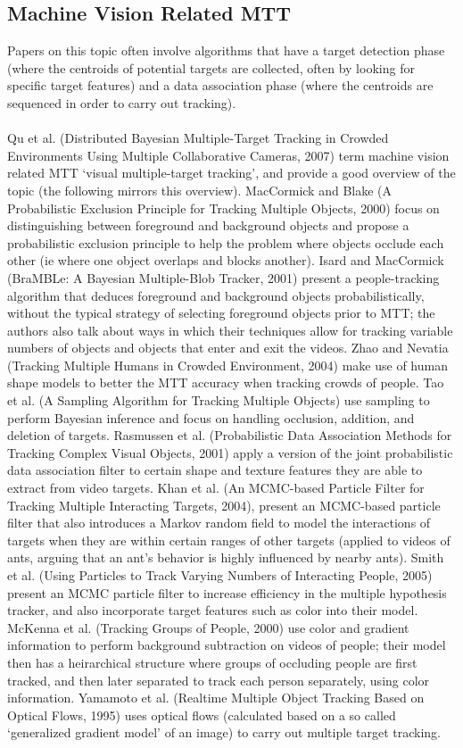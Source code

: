 \documentclass{article}
\begin{document}
\subsection*{Machine Vision Related MTT}
\vspace{6pt}
Papers on this topic often involve algorithms that have a target detection phase (where the centroids of potential targets are collected, often by looking for specific target features) and a data association phase (where the centroids are sequenced in order to carry out tracking).\\
\\
Qu et al. (Distributed Bayesian Multiple-Target Tracking in Crowded Environments Using Multiple Collaborative Cameras, 2007) term machine vision related MTT `visual multiple-target tracking', and provide a good overview of the topic (the following mirrors this overview). MacCormick and Blake (A Probabilistic Exclusion Principle for Tracking Multiple Objects, 2000) focus on distinguishing between foreground and background objects and propose a probabilistic exclusion principle to help the problem where objects occlude each other (ie where one object overlaps and blocks another). Isard and MacCormick (BraMBLe: A Bayesian Multiple-Blob Tracker, 2001) present a people-tracking algorithm that deduces foreground and background objects probabilistically, without the typical strategy of selecting foreground objects prior to MTT; the authors also talk about ways in which their techniques allow for tracking variable numbers of objects and objects that enter and exit the videos. Zhao and Nevatia (Tracking Multiple Humans in Crowded Environment, 2004) make use of human shape models to better the MTT accuracy when tracking crowds of people. Tao et al. (A Sampling Algorithm for Tracking Multiple Objects) use sampling to perform Bayesian inference and focus on handling occlusion, addition, and deletion of targets. Rasmussen et al. (Probabilistic Data Association Methods for Tracking Complex Visual Objects, 2001) apply a version of the joint probabilistic data association filter to certain shape and texture features they are  able to extract from video targets. Khan et al. (An MCMC-based Particle Filter for Tracking Multiple Interacting Targets, 2004), present an MCMC-based particle filter that also introduces a Markov random field to model the interactions of targets when they are within certain ranges of other targets (applied to videos of ants, arguing that an ant's behavior is highly influenced by nearby ants). Smith et al. (Using Particles to Track Varying Numbers of Interacting People, 2005) present an MCMC particle filter to increase efficiency in the multiple hypothesis tracker, and also incorporate target features such as color into their model. McKenna et al. (Tracking Groups of People, 2000) use color and gradient information to perform background subtraction on videos of people; their model then has a heirarchical structure where groups of occluding people are first tracked, and then later separated to track each person separately, using color information. Yamamoto et al. (Realtime Multiple Object Tracking Based on Optical Flows, 1995) uses optical flows (calculated based on a so called `generalized gradient model' of an image) to carry out multiple target tracking.\\
\end{document}
